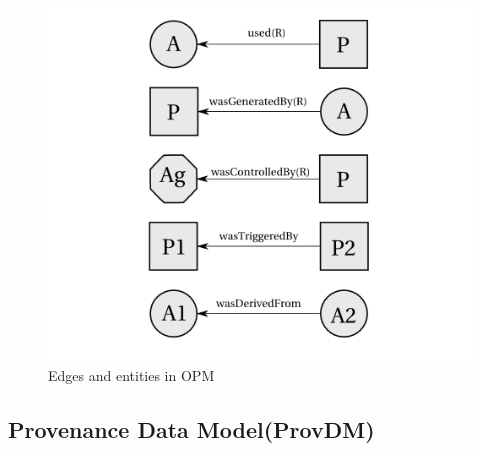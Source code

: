 \begin{figure}[h!]
\begin{center}

\includegraphics{opm_convention.PNG}
\end{center}
\caption{Edges and entities in OPM}
\label{autom}
\end{figure}


\subsection{Provenance Data Model(ProvDM)}

